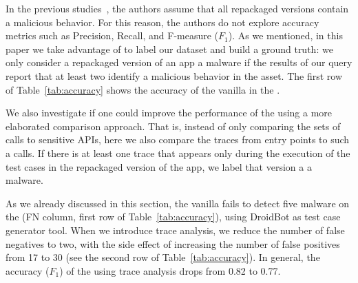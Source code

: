 In the previous studies~\cite{DBLP:conf/wcre/BaoLL18,DBLP:journals/jss/CostaMMSSBNR22},
the authors assume that all repackaged versions contain a
malicious behavior. For this reason, the authors do not
explore accuracy metrics such as Precision, Recall, and
F-measure ($F_1$). As we mentioned, in this paper we take advantage
of \vt to label our dataset and build a ground truth: we only
consider a repackaged version of an app a malware if the results
of our \vt query report that at least two
\se identify a malicious behavior in the asset.
The first row of Table~\ref{tab:accuracy} shows the accuracy of the
vanilla \mas in the \sds.

\begin{table}[htb]
  \caption{Accuracy of the \mas in both datasets.}
  \label{tab:accuracy}
\end{table}

We also investigate if one could improve the performance of
the \mas using a more elaborated comparison approach.
That is, instead of only comparing the sets of calls to sensitive APIs,
here we also compare the traces from entry points to such a calls. If there is
at least one trace that appears only during the execution of the
test cases in the repackaged version of the app, we
label that version a a malware.

As we already discussed in this section, the vanilla \mas fails
to detect five malware on the \sds (FN column, first row of Table~\ref{tab:accuracy}),
using DroidBot as test case generator tool. When we introduce trace analysis, we reduce the
number of false negatives to two, with the side effect of increasing the
number of false positives from 17 to 30 (see the second row of Table~\ref{tab:accuracy}).
In general, the accuracy ($F_1$) of the \mas using trace analysis drops from 0.82 to 0.77.

